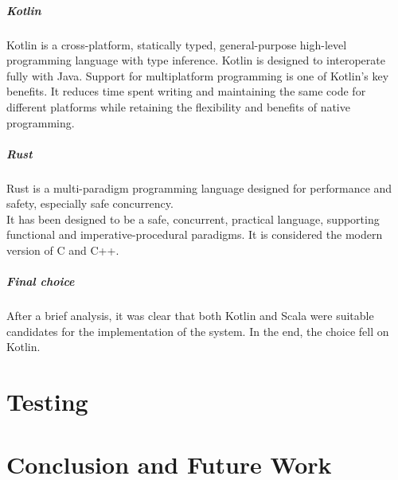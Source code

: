 \documentclass[12pt,a4paper,openright,twoside]{book}
\begin{document}
\paragraph*{Kotlin}
Kotlin is a cross-platform, statically typed, general-purpose high-level programming language with type inference. 
Kotlin is designed to interoperate fully with Java.
Support for multiplatform programming is one of Kotlin’s key benefits. It reduces time spent writing and maintaining 
the same code for different platforms while retaining the flexibility and benefits of native programming.


\paragraph*{Rust}

Rust is a multi-paradigm programming language designed for performance and safety, especially safe concurrency. \\
It has been designed to be a safe, concurrent, practical language, supporting functional and imperative-procedural paradigms.
It is considered the modern version of C and C++.

\paragraph*{Final choice}
After a brief analysis, it was clear that both Kotlin and Scala were suitable candidates for the implementation of the system.
In the end, the choice fell on Kotlin.

\chapter{Testing}

\chapter{Conclusion and Future Work}


\backmatter




\end{document}
